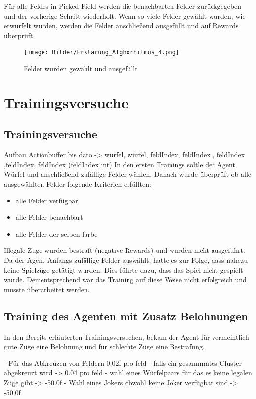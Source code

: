 Für alle Feldes in Picked Field werden die benachbarten Felder zurückgegeben und der vorherige Schritt wiederholt.
Wenn so viele Felder gewählt wurden, wie erwürfelt wurden, werden die Felder anschließend ausgefüllt und auf Rewards überprüft.

\begin{figure}[!h]
	\centering
	\texttt{[image: Bilder/Erklärung\_Alghorhitmus\_4.png]}
	\caption{Felder wurden gewählt und ausgefüllt}
\end{figure}


\newpage


\section{Trainingsversuche}
\subsection{Trainingsversuche}

Aufbau Actionbuffer bis dato -> würfel, würfel, feldIndex, feldIndex , feldIndex ,feldIndex, feldIndex (feldIndex int)
In den ersten Trainings soltle der Agent Würfel und anschließend zufällige Felder wählen.
Danach wurde überprüft ob alle ausgewählten Felder folgende Kriterien erfüllten:
\begin{itemize}
\item alle Felder verfügbar
\item alle Felder benachbart
\item alle Felder der selben farbe
\end{itemize}

Illegale Züge wurden bestraft (negative Rewards) und wurden nicht ausgeführt.
Da der Agent Anfangs zufällige Felder auswählt, hatte es zur Folge, dass nahezu keine Spielzüge getätigt wurden.
Dies führte dazu, dass das Spiel nicht gespielt wurde.
Dementsprechend war das Training auf diese Weise nicht erfolgreich und musste überarbeitet werden.




\subsection{Training des Agenten mit Zusatz Belohnungen}
In den Bereits erläuterten Trainingsversuchen, bekam der Agent für vermeintlich gute Züge eine Belohnung und für schlechte Züge eine Bestrafung.

- Für das Abkreuzen von Feldern 0.02f pro feld
- falls ein gesammmtes Cluster abgekreuzt wird -> 0.04 pro feld
- wahl eines Würfelpaars für das es keine legalen Züge gibt -> -50.0f
- Wahl eines Jokers obwohl keine Joker verfügbar sind -> -50.0f

